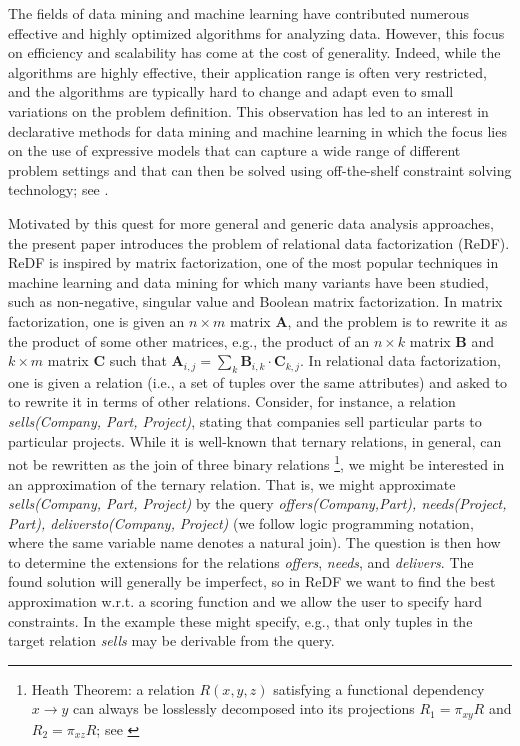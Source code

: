 The fields of data mining and machine learning have contributed numerous effective and highly optimized algorithms for analyzing data. 
However, this  focus on efficiency and scalability has come at the cost of generality. 
Indeed, while the algorithms are highly effective, their application range is often very restricted, 
and the algorithms are typically hard to change and adapt even to small variations on the problem definition.
This observation has led to an interest in declarative methods for data mining and machine learning in which the focus lies on 
the use of expressive models that can capture a wide range of different problem settings
and that can then be solved using off-the-shelf constraint solving technology; see \cite{miningZinc,DeRaedtECML12,DMWorkshop,DeRaedtAAAI15}.

Motivated by this quest for more general and generic data analysis approaches, 
the present paper introduces the problem of relational data factorization (ReDF). ReDF is inspired by matrix factorization, one of the most popular techniques in machine learning and data mining
for which many variants have been studied, such as non-negative, singular value and Boolean matrix factorization. 
In matrix factorization, one is given an $n \times m$ matrix $\mathbf{A}$, and the problem is to rewrite it
as the product of some other matrices, e.g., the product of an $n \times  k$ matrix $\mathbf{B}$ and $k\times m$ matrix $\mathbf{C}$
such that ${\mathbf{A}_{i,j} = \sum_k \mathbf{B}_{i,k} \cdot  \mathbf{C}_{k,j}}$.  
In relational data factorization, one is given a relation (i.e., a set of tuples over the same attributes) and asked to
to rewrite it in terms of other relations.  Consider, for instance, a relation
\textit{sells(Company, Part, Project)}, stating that companies sell particular parts to particular projects.
While it is well-known that ternary relations, in general, can not be rewritten
as the join of three binary relations \parencite{heath_theorem, ternary_decomposition}\footnote{Heath Theorem: a relation $R(x,y,z)$ satisfying a functional dependency $x \rightarrow y$ can always be losslessly decomposed into its projections $R_1=\pi_{xy}R$ and $R_2=\pi_{xz}R$; see \parencite[Table 5]{ternary_decomposition}}, we might be interested in an approximation of 
the ternary relation. That is, we might approximate \textit{sells(Company, Part, Project)} 
by the query \textit{offers(Company,Part), needs(Project, Part), deliversto(Company,} \textit{Project)} (we follow logic programming notation, where the same variable name denotes a natural join).
The question is then how to determine the extensions for the relations \textit{offers}, \textit{needs}, and \textit{delivers}.
The found solution will generally be imperfect, so in ReDF we want to find the best approximation w.r.t. a scoring function and we allow the user to specify hard constraints. In the example these might specify, e.g., that only tuples in the target relation \textit{sells} may be derivable from the query. 

